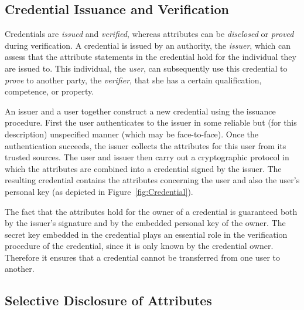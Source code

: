 
\subsection{Credential Issuance and Verification}

Credentials are \emph{issued} and \emph{verified}, whereas attributes can be
\emph{disclosed} or \emph{proved} during verification. A credential is issued
by an authority, the \emph{issuer}, which can assess that the
attribute statements in the credential hold for the
individual they are issued to. This individual, the \emph{user}, can
subsequently use this credential to \emph{prove} to another party, the
\emph{verifier}, that she has a certain qualification,
competence, or property.

An issuer and a user together construct a new credential using the issuance
procedure. First the user authenticates
 to the issuer in some reliable but (for this
description) unspecified manner (which may be face-to-face). Once the
authentication succeeds, the issuer collects the
attributes for this user from its trusted sources. The user
and issuer then carry out a cryptographic protocol in which the attributes
are combined into a credential signed by the issuer. The resulting credential
contains the attributes concerning the user and also the user's personal key (as
depicted in Figure~\ref{fig:Credential}).

The fact that the attributes hold for the owner of a
credential is guaranteed both by the issuer's signature and by the embedded
personal key of the owner. The secret key embedded in the credential plays an 
essential role in the verification procedure of 
the credential, since it is only known by the credential owner. Therefore it 
ensures that a credential cannot be transferred from one user to another.

\subsection{Selective Disclosure of Attributes}

